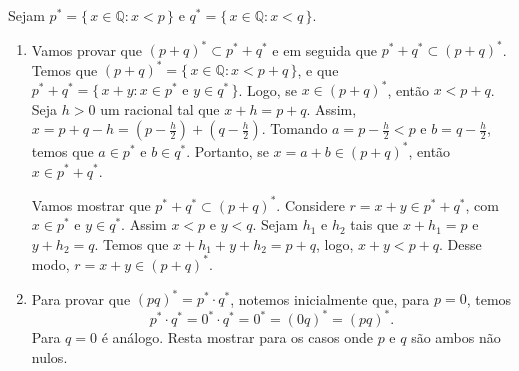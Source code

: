 \documentclass[../main.tex]{subfiles}
\begin{document}
\begin{dem}
    Sejam $p^* = \{\,x \in \mathbb{Q} : x < p\,\}$ e $q^* = \{\,x \in \mathbb{Q} : x < q\,\}$.
    \begin{enumerate}[label=(\roman*)]
     \item Vamos provar que $(p+q)^* \subset p^* + q^*$ e em seguida que $p^*+q^*  \subset (p+q)^*$.
     Temos que $(p+q)^* = \{\, x \in \mathbb{Q} : x < p+q \,\}$, e que $p^* + q^* = \{\,x+y : x \in p^* \text{ e } y \in q^*\,\}$. Logo, se $x \in (p+q)^*$, então $x<p+q$. Seja $h>0$ um racional tal que $x+h = p+q$. Assim, $x = p+q-h = \left( p-\frac{h}{2}\right) + \left(q-\frac{h}{2} \right) $. Tomando $a = p - \frac{h}{2} < p$ e $b = q - \frac{h}{2}$, temos que $a \in p^*$ e $b \in q^*$. 
     Portanto, se $x = a+b \in (p+q)^*$, então $x \in p^* + q^*$.

     Vamos mostrar que $p^* + q^* \subset (p+q)^*$. Considere $r = x+y \in p^*+q^*$, com $x \in p^*$ e $y \in q^*$. Assim $x < p$ e $y < q$. Sejam $h_1$ e $h_2$ tais que $x+h_1 = p$ e $y+h_2 = q$. Temos que $x+h_1 + y + h_2 = p+q$, logo, $x+y < p+q$. Desse modo, $r = x+y \in (p+q)^*$. 


    \item Para provar que $(pq)^* = p^*\cdot q^*$, notemos inicialmente que, para $p=0$, temos
        \[ p^* \cdot q^* = 0^* \cdot q^* = 0^* = (0q)^* = (pq)^*. \]
        Para $q = 0$ é análogo. Resta mostrar para os casos onde $p$ e $q$ são ambos não nulos. 


\end{enumerate}
\end{dem}
\end{document}
